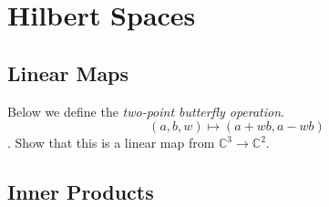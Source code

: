 
\chapter{Hilbert Spaces}


\section{Linear Maps}

Below we define the \textit{two-point butterﬂy operation}.
$$(a,b,w) \mapsto (a + wb, a-wb)$$.
Show that this is a linear map from $\mathbb{C}^3 \rightarrow \mathbb{C}^2$. 

\section{Inner Products}